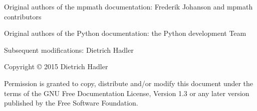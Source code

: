 \small
\noindent 
Original authors of the mpmath documentation: Frederik Johanson and mpmath contributors

\noindent 
Original authors of the Python documentation: the Python development Team


\noindent 
Subsequent modifications: Dietrich Hadler




\vspace{20cm}


 

%


\noindent
Copyright \copyright \hspace{0.5mm}  2015 Dietrich Hadler

\vspace{1cm}

\noindent
Permission is granted to copy, distribute and/or modify this document under the terms of the GNU Free Documentation License, Version 1.3 or any later version published by the Free Software Foundation. 
\normalsize